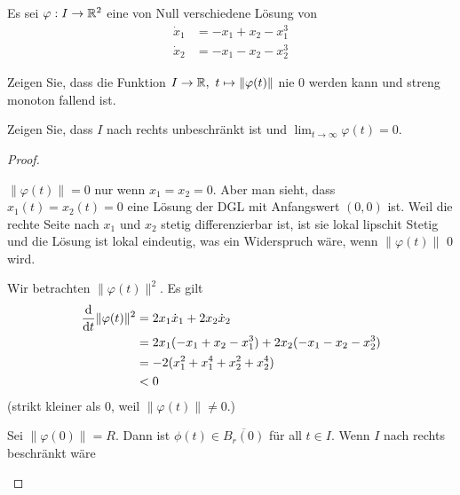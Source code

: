 \begin{Problem}
	Es sei $\varphi : I \to \mathbb{R}^2$ eine von Null verschiedene Lösung von
	\begin{align*}
		\dot{x}_1&=-x_1+x_2-x_1^3\\
		\dot{x}_2&=-x_1-x_2-x_2^3
	\end{align*}
	\begin{parts}
	\item Zeigen Sie, dass die Funktion $I\to \mathbb{R},~t\mapsto \|\varphi(t)\|$ nie $0$ werden kann und streng monoton fallend ist.
	\item Zeigen Sie, dass $I$ nach rechts unbeschränkt ist und $\lim_{t\to\infty} \varphi(t)=0$.
	\end{parts}
\end{Problem}
\begin{proof}
	\begin{parts}
	\item $\|\varphi(t)\|=0$ nur wenn $x_1=x_2=0$. Aber man sieht, dass $x_1(t)=x_2(t)=0$ eine L\"{o}sung der DGL mit Anfangswert $(0,0)$ ist. Weil die rechte Seite nach $x_1$ und $x_2$ stetig differenzierbar ist, ist sie lokal lipschit Stetig und die L\"{o}sung ist lokal eindeutig, was ein Widerspruch wäre, wenn $\|\varphi(t)\|$ 0 wird.

		Wir betrachten $\|\varphi(t)\|^2$. Es gilt
		\begin{align*}
			\dv{t}\|\varphi(t)\|^2 &= 2x_1\dot{x}_1 + 2x_2\dot{x}_2\\
					       &=2x_1(-x_1+x_2-x_1^3) + 2x_2(-x_1-x_2-x_2^3)\\
					       &=-2(x_1^2+x_1^4+x_2^2+x_2^4)\\
					       &< 0
		\end{align*}
		(strikt kleiner als 0, weil $\|\varphi(t)\|\neq 0$.)
	\item Sei $\|\varphi(0)\|=R$. Dann ist $\phi(t) \in \overline{B_r(0)}$ f\"{u}r all $t\in I$. Wenn $I$ nach rechts beschränkt wäre
	\end{parts}
\end{proof}
